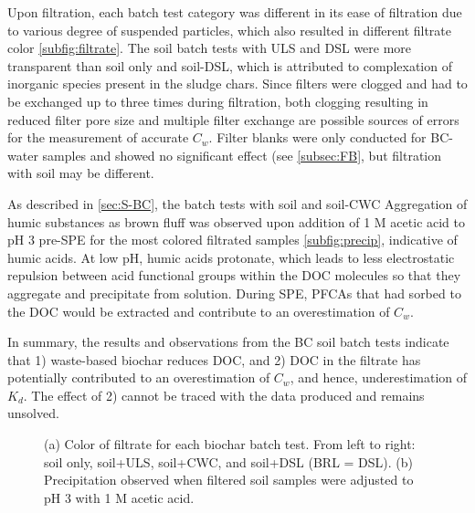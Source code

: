 Upon filtration, each batch test category was different in its ease of filtration due to various degree of suspended particles, which also resulted in different filtrate color \cref{subfig:filtrate}. The soil batch tests with ULS and DSL were more transparent than soil only and soil-DSL, which is attributed to complexation of inorganic species present in the sludge chars. Since filters were clogged and had to be exchanged up to three times during filtration, both clogging resulting in reduced filter pore size and multiple filter exchange are possible sources of errors for the measurement of accurate $C_w$. Filter blanks were only conducted for BC-water samples and showed no significant effect (see \cref{subsec:FB}, but filtration with soil may be different. 

As described in \cref{sec:S-BC}, the batch tests with soil and soil-CWC Aggregation of humic substances as brown fluff was observed upon addition of 1 M acetic acid to pH 3 pre-SPE for the most colored filtrated samples \cref{subfig:precip}, indicative of humic acids. At low pH, humic acids protonate, which leads to less electrostatic repulsion between acid functional groups within the DOC molecules so that they aggregate and precipitate from solution. During SPE, PFCAs that had sorbed to the DOC would be extracted and contribute to an overestimation of $C_w$. 

In summary, the results and observations from the BC soil batch tests indicate that 1) waste-based biochar reduces DOC, and 2) DOC in the filtrate has potentially contributed to an overestimation of $C_w$, and hence, underestimation of $K_d$. The effect of 2) cannot be traced with the data produced and remains unsolved. 

\begin{figure}[tbh]
\hfill
{}
\caption{(a) Color of filtrate for each biochar batch test. From left to right: soil only, soil+ULS, soil+CWC, and soil+DSL (BRL = DSL). (b) Precipitation observed when filtered soil samples were adjusted to pH 3 with 1 M acetic acid.}
\label{fig:DOC_tubes}
\end{figure}


